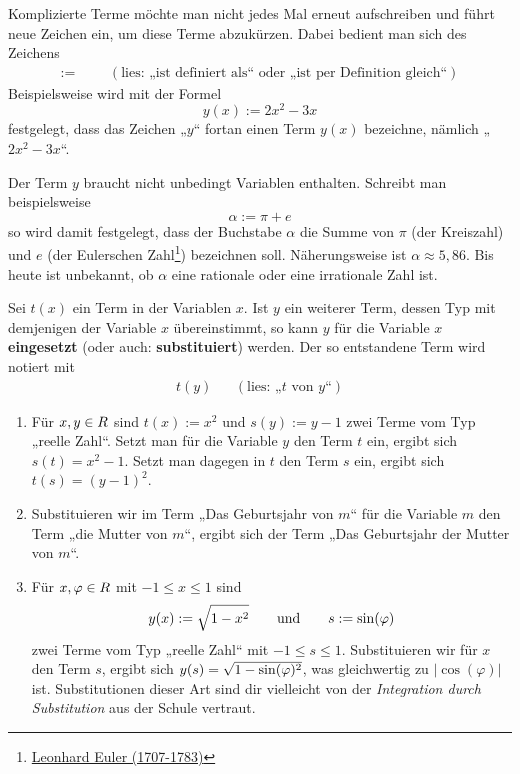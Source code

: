 \begin{nota}[$:=$]
    Komplizierte Terme möchte man nicht jedes Mal erneut aufschreiben und führt neue Zeichen ein, um diese Terme abzukürzen. Dabei bedient man sich des Zeichens
    \begin{align*}
        := &&& (\text{lies: „ist definiert als“ oder „ist per Definition gleich“})
    \end{align*}
    Beispielsweise wird mit der Formel
        \[ y(x) := 2x^2-3x \]
    festgelegt, dass das Zeichen „$y$“ fortan einen Term $y(x)$ bezeichne, nämlich „$2x^2-3x$“.

    Der Term $y$ braucht nicht unbedingt Variablen enthalten. Schreibt man beispielsweise
        \[ \alpha:= \pi + e\]
    so wird damit festgelegt, dass der Buchstabe $\alpha$ die Summe von $\pi$ (der Kreiszahl) und $e$ (der Eulerschen Zahl\footnote{\href{https://de.wikipedia.org/wiki/Leonhard_Euler}{Leonhard Euler (1707-1783)}}) bezeichnen soll. Näherungsweise ist $\alpha \approx 5{,}86$. Bis heute ist unbekannt, ob $\alpha$ eine rationale oder eine irrationale Zahl ist.
\end{nota}


\begin{defin}[* Variablensubstitution] \label{def:substitution}
    Sei $t(x)$ ein Term in der Variablen $x$. Ist $y$ ein weiterer Term, dessen Typ mit demjenigen der Variable $x$ übereinstimmt, so kann $y$ für die Variable $x$ \textbf{eingesetzt} (oder auch: \textbf{substituiert}) werden. Der so entstandene Term wird notiert mit
    \begin{align*}
        t(y) && (\text{lies: „$t$ von $y$“})
    \end{align*}
\end{defin}


\begin{bsp}[*] \quad \label{bsp:substitution}
    \begin{enumerate}
        \item Für $x,y\in\relax R$ sind $t(x):=x^2$ und $s(y):=y-1$ zwei Terme vom Typ „reelle Zahl“. Setzt man für die Variable $y$ den Term $t$ ein, ergibt sich $s(t)=x^2-1$. Setzt man dagegen in $t$ den Term $s$ ein, ergibt sich $t(s)=(y-1)^2$.
        \item Substituieren wir im Term „Das Geburtsjahr von $m$“ für die Variable $m$ den Term „die Mutter von $m$“, ergibt sich der Term „Das Geburtsjahr der Mutter von $m$“.
        \item Für $x,\varphi\in \relax R$ mit $-1\le x\le 1$ sind
            \[ y(x):=\sqrt{\strut 1-x^2} \qquad\text{und}\qquad s:=\sin(\varphi) \]
        zwei Terme vom Typ „reelle Zahl“ mit $-1\le s\le 1$. Substituieren wir für $x$ den Term $s$, ergibt sich $y(s)=\sqrt{1-\sin\!\smash{(\varphi)}^2}$, was gleichwertig zu $\vert\cos(\varphi)\vert$ ist. Substitutionen dieser Art sind dir vielleicht von der \emph{Integration durch Substitution} aus der Schule vertraut.
    \end{enumerate}
\end{bsp}


